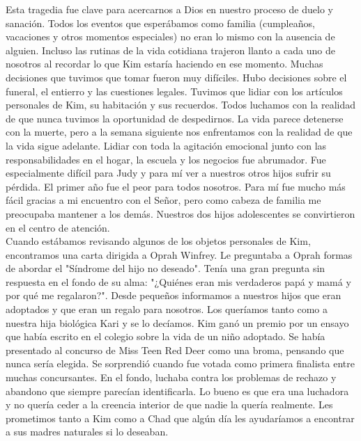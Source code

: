 \documentclass[twoside, 12pt]{book}
\begin{document}
Esta tragedia fue clave para acercarnos a Dios en nuestro proceso de duelo y sanación. Todos los eventos que esperábamos como familia (cumpleaños, vacaciones y otros momentos especiales) no eran lo mismo con la ausencia de alguien. Incluso las rutinas de la vida cotidiana trajeron llanto a cada uno de nosotros al recordar lo que Kim estaría haciendo en ese momento. Muchas decisiones que tuvimos que tomar fueron muy difíciles. Hubo decisiones sobre el funeral, el entierro y las cuestiones legales. Tuvimos que lidiar con los artículos personales de Kim, su habitación y sus recuerdos. Todos luchamos con la realidad de que nunca tuvimos la oportunidad de despedirnos. La vida parece detenerse con la muerte, pero a la semana siguiente nos enfrentamos con la realidad de que la vida sigue adelante. Lidiar con toda la agitación emocional junto con las responsabilidades en el hogar, la escuela y los negocios fue abrumador. Fue especialmente difícil para Judy y para mí ver a nuestros otros hijos sufrir su pérdida. El primer año fue el peor para todos nosotros. Para mí fue mucho más fácil gracias a mi encuentro con el Señor, pero como cabeza de familia me preocupaba mantener a los demás. Nuestros dos hijos adolescentes se convirtieron en el centro de atención.\\

Cuando estábamos revisando algunos de los objetos personales de Kim, encontramos una carta dirigida a Oprah Winfrey. Le preguntaba a Oprah formas de abordar el "Síndrome del hijo no deseado". Tenía una gran pregunta sin respuesta en el fondo de su alma: "¿Quiénes eran mis verdaderos papá y mamá y por qué me regalaron?". Desde pequeños informamos a nuestros hijos que eran adoptados y que eran un regalo para nosotros. Los queríamos tanto como a nuestra hija biológica Kari y se lo decíamos. Kim ganó un premio por un ensayo que había escrito en el colegio sobre la vida de un niño adoptado. Se había presentado al concurso de Miss Teen Red Deer como una broma, pensando que nunca sería elegida. Se sorprendió cuando fue votada como primera finalista entre muchas concursantes. En el fondo, luchaba contra los problemas de rechazo y abandono que siempre parecían identificarla. Lo bueno es que era una luchadora y no quería ceder a la creencia interior de que nadie la quería realmente. Les prometimos tanto a Kim como a Chad que algún día les ayudaríamos a encontrar a sus madres naturales si lo deseaban.\\
\end{document}
